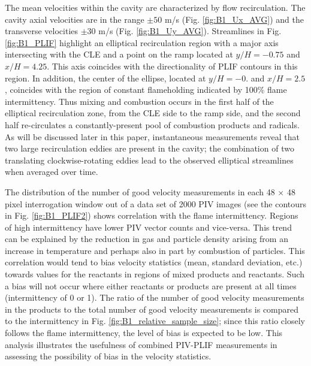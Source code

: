 The mean velocities within the cavity are characterized by flow recirculation. The cavity axial velocities are in the range $\pm 50$ m/s (Fig. \ref{fig:B1_Ux_AVG}) and the transverse velocities $\pm 30$ m/s (Fig. \ref{fig:B1_Uy_AVG}). Streamlines in Fig. \ref{fig:B1_PLIF} highlight an elliptical recirculation region with a major axis intersecting with the CLE and a point on the ramp located at $y/H=-0.75$ and $x/H=4.25$. This axis coincides with the directionality of PLIF contours in this region. In addition, the center of the ellipse, located at $y/H=-0.$ and $x/H=2.5$, coincides with the region of constant flameholding indicated by 100\% flame intermittency. Thus mixing and combustion occurs in the first half of the elliptical recirculation zone, from the CLE side to the ramp side, and the second half re-circulates a constantly-present pool of combustion products and radicals. As will be discussed later in this paper, instantaneous measurements reveal that two large recirculation eddies are present in the cavity; the combination of two translating clockwise-rotating eddies lead to the observed elliptical streamlines when averaged over time.

The distribution of the number of good velocity measurements in each 48 $\times$ 48 pixel interrogation window out of a data set of 2000 PIV images (see the contours in Fig. \ref{fig:B1_PLIF2}) shows correlation with the flame intermittency. Regions of high intermittency have lower PIV vector counts and vice-versa. This trend can be explained by the reduction in gas and particle density arising from an increase in temperature and perhaps also in part by combustion of particles. This correlation would tend to bias velocity statistics (mean, standard deviation, etc.) towards values for the reactants in regions of mixed products and reactants.  Such a bias will not occur where either reactants or products are present at all times (intermittency of 0 or 1). The ratio of the number of good velocity measurements in the products to the total number of good velocity measurements is compared to the intermittency in Fig. \ref{fig:B1_relative_sample_size}; since this ratio closely follows the flame intermittency, the level of bias is expected to be low. This analysis illustrates the usefulness of combined PIV-PLIF measurements in assessing the possibility of bias in the velocity statistics.

